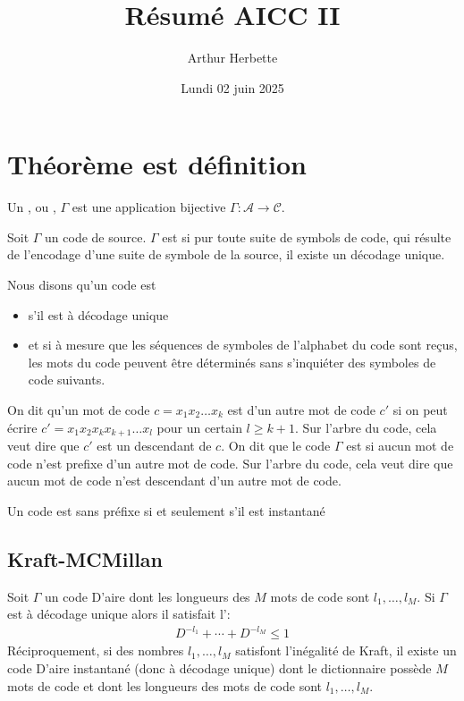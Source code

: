 \documentclass[a4paper]{article}
\title{Résumé AICC II}
\author{Arthur Herbette}
\date{Lundi 02 juin 2025}
\begin{document}
\maketitle
\section{Théorème est définition}

\begin{definition}
Un , ou , $\Gamma$ est une application bijective $\Gamma: \mathcal{A} \to \mathcal{C}$.
\end{definition}
\begin{definition}
Soit $\Gamma$ un code de source. $\Gamma$ est  si pur toute suite de symbols de code, qui résulte de l'encodage d'une suite de symbole de la source, il existe un décodage unique.
\end{definition}
\begin{definition}
Nous disons qu'un code est 
\begin{itemize}
    \item s'il est à décodage unique
    \item et si à mesure que les séquences de symboles de l'alphabet du code sont reçus, les mots du code peuvent être déterminés sans s'inquiéter des symboles de code suivants.
\end{itemize}
\end{definition}
\begin{definition}
    On dit qu'un mot de code $c = x_1x_2\ldots x_k$ est  d'un autre mot de code $c' $ si on peut écrire $c' = x_1x_2x_kx_{k+1}\ldots x_l$ pour un certain $ l \geq k + 1 $. Sur l'arbre du code, cela veut dire que $c'$ est un descendant de $c$. On dit que le code $\Gamma$ est  si aucun mot de code n'est prefixe d'un autre mot de code. Sur l'arbre du code, cela veut dire que aucun mot de code n'est descendant d'un autre mot de code.
\end{definition}
\begin{theoreme}
Un code est sans préfixe si et seulement s'il est instantané
\end{theoreme}


\subsection{Kraft-MCMillan}
\begin{theoreme}
Soit $\Gamma$ un code D'aire dont les longueurs des $M$ mots de code sont $l_1, \ldots, l_M$. Si $\Gamma$ est à décodage unique alors il satisfait l':
\begin{align*}D^{-l_1} + \cdots + D^{-l_M} \leq 1 \end{align*}
Réciproquement, si des nombres $l_1, \ldots, l_M$ satisfont l'inégalité de Kraft, il existe un code D'aire instantané (donc à décodage unique) dont le dictionnaire possède $M$ mots de code et dont les longueurs des mots de code sont $l_1, \ldots, l_M$.
\end{theoreme}
\end{document}
